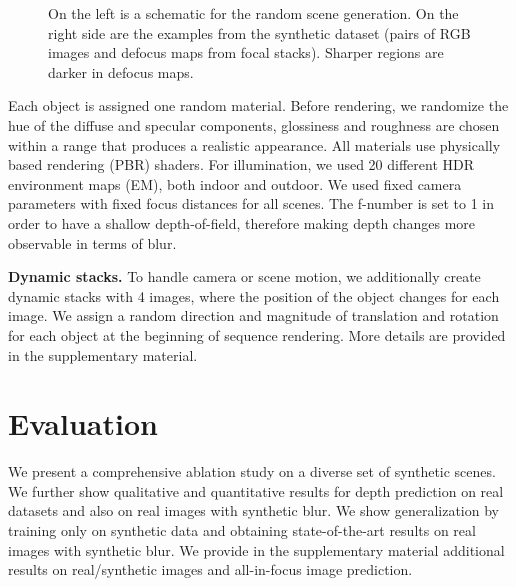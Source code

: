 \documentclass[10pt,twocolumn,letterpaper]{article}
\begin{document}
\begin{figure}
\begin{center}
\end{center}

   \caption{On the left is a schematic for the random scene generation. On the right side are the examples from the synthetic dataset (pairs of RGB images and defocus maps from focal stacks). Sharper regions are darker in defocus maps.
   }
\label{fig:SynthExample}
\end{figure}


Each object is assigned one random material. Before
rendering, we randomize the hue of the diffuse and specular components, glossiness and roughness are chosen within a range that produces a realistic appearance. All materials use physically based rendering (PBR) shaders.
For illumination, we used 20 different HDR environment maps (EM), both indoor and outdoor.
We used fixed camera parameters with fixed focus distances for all scenes. The f-number is set to 1 in order to have a shallow depth-of-field, therefore making depth changes more observable in terms of blur.


\noindent\textbf{Dynamic stacks.} To handle camera or scene motion, we additionally create dynamic stacks with 4 images, where the position of the object changes for each image. We assign a random direction and magnitude of translation and rotation for each object at the beginning of sequence rendering. More details are provided in the supplementary material.





\vspace{-1em}
\section{Evaluation} \label{sec:evaluation}
We present a comprehensive ablation study on a diverse set of synthetic scenes. We further show qualitative and quantitative results for depth prediction on real datasets and also on real images with synthetic blur. We show generalization by training only on synthetic data and obtaining state-of-the-art results on real images with synthetic blur.
We provide in the supplementary material additional results on real/synthetic images and all-in-focus image prediction.


\vspace{-1em}
\end{document}
